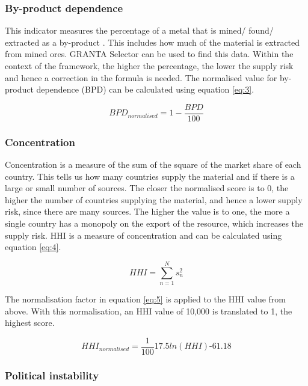 \documentclass{article}
\begin{document}
\subsubsection{By-product dependence}

This indicator measures the percentage of a metal that is mined/ found/ extracted as a by-product \cite{graedel2014employing}. This includes how much of the material is extracted from mined ores. GRANTA Selector can be used to find this data. Within the context of the framework, the higher the percentage, the lower the supply risk and hence a correction in the formula is needed. The normalised value for by-product dependence (BPD) can be calculated using equation \ref{eq:3}. 

\begin{equation} \label{eq:3}
BPD_{normalised} = 1 - \frac{BPD}{100}
\end{equation}

\subsubsection{Concentration}

Concentration is a measure of the sum of the square of the market share of each country. This tells us how many countries supply the material and if there is a large or small number of sources. The closer the normalised score is to 0, the higher the number of countries supplying the material, and hence a lower supply risk, since there are many sources. The higher the value is to one, the more a single country has a monopoly on the export of the resource, which increases the supply risk. HHI \cite{herfindahl1997concentration} is a measure of concentration and can be calculated using equation \ref{eq:4}. 

\begin{equation} \label{eq:4}
HHI = \sum_{n=1}^{N} s_{n}^2 
\end{equation}

The normalisation factor in equation \ref{eq:5}  \cite{doi:10.1021/es203534z} is applied to the HHI value from above. With this normalisation, an HHI value of 10,000 is translated to 1, the highest score.

\begin{equation} \label{eq:5}
HHI_{normalised}=\frac{1}{100} 17.5 ln(HHI) \text{-} 61.18
\end{equation}

\subsubsection{Political instability}
\end{document}
